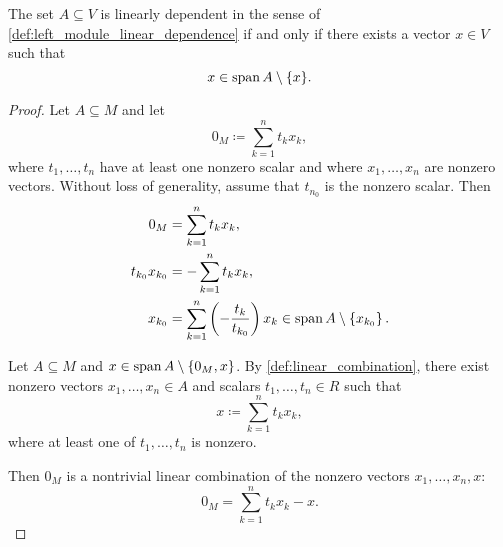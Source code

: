 \begin{proposition}\label{thm:vector_space_linear_dependence}
  The set \( A \subseteq V \) is linearly dependent in the sense of \cref{def:left_module_linear_dependence} if and only if there exists a vector \( x \in V \) such that
  \begin{equation*}
    x \in \operatorname{span}{A} \setminus \{ x \}.
  \end{equation*}
\end{proposition}
\begin{proof}
  \Implies Let \( A \subseteq M \) and let
  \begin{equation*}
    0_M \coloneqq \sum_{k=1}^n t_k x_k,
  \end{equation*}
  where \( t_1, \ldots, t_n \) have at least one nonzero scalar and where \( x_1, \ldots, x_n \) are nonzero vectors. Without loss of generality, assume that \( t_{n_0} \) is the nonzero scalar. Then
  \begin{align*}
    0_M &= \sum_{k=1}^n t_k x_k, \\
    t_{k_0} x_{k_0} &= -\sum_{k=1}^n t_k x_k, \\
    x_{k_0} &= \sum_{k=1}^n \left(-\frac {t_k} {t_{k_0}} \right) x_k \in \operatorname{span}{A} \setminus \left\{ x_{k_0} \right\}.
  \end{align*}

  \ImpliedBy Let \( A \subseteq M \) and \( x \in \operatorname{span}{A} \setminus \{ 0_M, x \} \). By \cref{def:linear_combination}, there exist nonzero vectors \( x_1, \ldots, x_n \in A \) and scalars \( t_1, \ldots, t_n \in R \) such that
  \begin{equation*}
    x \coloneqq \sum_{k=1}^n t_k x_k,
  \end{equation*}
  where at least one of \( t_1, \ldots, t_n \) is nonzero.

  Then \( 0_M \) is a nontrivial linear combination of the nonzero vectors \( x_1, \ldots, x_n, x \):
  \begin{equation*}
    0_M = \sum_{k=1}^n t_k x_k - x.
  \end{equation*}
\end{proof}

